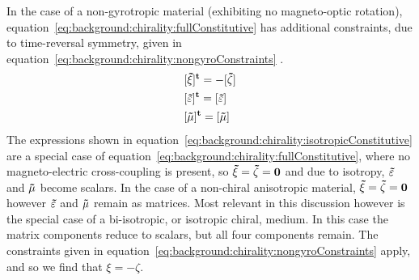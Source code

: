 In the case of a non-gyrotropic material (exhibiting no magneto-optic rotation), equation~\ref{eq:background:chirality:fullConstitutive} has additional constraints, due to time-reversal symmetry, given in equation~\ref{eq:background:chirality:nongyroConstraints} \cite{Ishimaru2003}.
\begin{equation}\label{eq:background:chirality:nongyroConstraints}
    \begin{split}
        &[\bf{\tilde \xi}]^t = -[\bf{\tilde \zeta}] \\
        &[\bf{\tilde \varepsilon}]^t = [\bf{\tilde \varepsilon}] \\
        &[\bf{\tilde \mu}]^t = [\bf{\tilde \mu}]
    \end{split}
\end{equation}
The expressions shown in equation~\ref{eq:background:chirality:isotropicConstitutive} are a special case of equation~\ref{eq:background:chirality:fullConstitutive}, where no magneto-electric cross-coupling is present, so $\bf{\tilde \xi}=\bf{\tilde \zeta}=0$ and due to isotropy, $\bf{\tilde \varepsilon}$ and $\bf{\tilde \mu}$ become scalars. 
In the case of a non-chiral anisotropic material, $\bf{\tilde \xi}=\bf{\tilde \zeta}=0$ however $\bf{\tilde \varepsilon}$ and $\bf{\tilde \mu}$ remain as matrices. Most relevant in this discussion however is the special case of a bi-isotropic, or isotropic chiral, medium. 
In this case the matrix components reduce to scalars, but all four components remain. The constraints given in equation~\ref{eq:background:chirality:nongyroConstraints} apply, and so we find that $\xi =-\zeta $.

